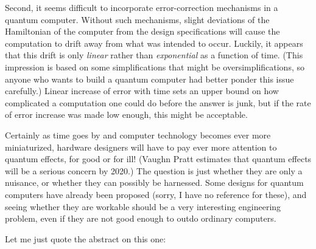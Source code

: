 \documentclass{article}
\def\tightlist{}
\renewcommand{\texttt}[1]{%
  \begingroup
  \ttfamily
  \begingroup\lccode`~=`/\lowercase{\endgroup\def~}{/\discretionary{}{}{}}%
  \begingroup\lccode`~=`[\lowercase{\endgroup\def~}{[\discretionary{}{}{}}%
  \begingroup\lccode`~=`.\lowercase{\endgroup\def~}{.\discretionary{}{}{}}%
  \catcode`/=\active\catcode`[=\active\catcode`.=\active
  \scantokens{#1\noexpand}%
  \endgroup
}
\begin{document}
Second, it seems difficult to incorporate error-correction mechanisms in
a quantum computer. Without such mechanisms, slight deviations of the
Hamiltonian of the computer from the design specifications will cause
the computation to drift away from what was intended to occur. Luckily,
it appears that this drift is only \emph{linear} rather than
\emph{exponential} as a function of time. (This impression is based on
some simplifications that might be oversimplifications, so anyone who
wants to build a quantum computer had better ponder this issue
carefully.) Linear increase of error with time sets an upper bound on
how complicated a computation one could do before the answer is junk,
but if the rate of error increase was made low enough, this might be
acceptable.

Certainly as time goes by and computer technology becomes ever more
miniaturized, hardware designers will have to pay ever more attention to
quantum effects, for good or for ill! (Vaughn Pratt estimates that
quantum effects will be a serious concern by 2020.) The question is just
whether they are only a nuisance, or whether they can possibly be
harnessed. Some designs for quantum computers have already been proposed
(sorry, I have no reference for these), and seeing whether they are
workable should be a very interesting engineering problem, even if they
are not good enough to outdo ordinary computers.

\noindent
Let me just quote the abstract on this one:
\end{document}
